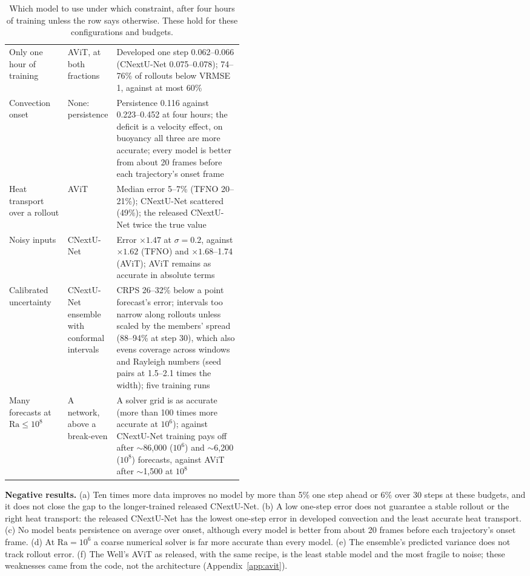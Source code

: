 \documentclass[11pt]{article}
\begin{document}
\begin{table}[tp]
\begin{tabularx}{\linewidth}{@{}>{\raggedright\arraybackslash}p{0.25\linewidth}>{\raggedright\arraybackslash}p{0.2\linewidth}>{\raggedright\arraybackslash}X@{}}
Only one hour of training & AViT, at both fractions & Developed one step 0.062--0.066 (CNextU-Net 0.075--0.078);
74--76\% of rollouts below VRMSE 1, against at most 60\% \\ \addlinespace[3pt]
Convection onset & None: persistence & Persistence 0.116 against 0.223--0.452 at four hours; the deficit is a velocity
effect, on buoyancy all three are more accurate; every model is better from about 20 frames before each
trajectory's onset frame \\ \addlinespace[3pt]
Heat transport over a rollout & AViT & Median error 5--7\% (TFNO 20--21\%); CNextU-Net scattered (49\%); the released
CNextU-Net twice the true value \\ \addlinespace[3pt]
Noisy inputs & CNextU-Net & Error $\times1.47$ at $\sigma=0.2$, against $\times1.62$ (TFNO) and $\times1.68$--1.74
(AViT); AViT remains as accurate in absolute terms \\ \addlinespace[3pt]
Calibrated uncertainty & CNextU-Net ensemble with conformal intervals & CRPS 26--32\% below a point forecast's error;
intervals too narrow along rollouts unless scaled by the members' spread (88--94\% at step 30), which also evens
coverage across windows and Rayleigh numbers (seed pairs at 1.5--2.1 times the width); five training runs \\
\addlinespace[3pt]
Many forecasts at $\mathrm{Ra}\le10^8$ & A network, above a break-even & A solver grid is as accurate (more than 100
times more accurate at $10^6$); against CNextU-Net training pays off after $\sim$86,000 ($10^6$) and $\sim$6,200
($10^8$) forecasts, against AViT after $\sim$1,500 at $10^8$ \\
\bottomrule
\end{tabularx}
\caption{Which model to use under which constraint, after four hours of training unless the row says otherwise. These
hold for these configurations and budgets.}
\label{tab:choice}
\end{table}

\textbf{Negative results.} (a) Ten times more data improves no model by more than 5\% one step ahead or 6\% over 30
steps at these budgets, and it does not close the gap to the longer-trained released CNextU-Net. (b) A low one-step
error does not guarantee
a stable rollout or the right heat transport: the released CNextU-Net has the lowest one-step error in developed
convection and the least accurate heat transport. (c) No model beats persistence on average over onset, although every model is better from about 20
frames before each trajectory's onset frame. (d) At
$\mathrm{Ra}=10^6$ a coarse numerical solver is far more accurate than every model. (e) The ensemble's predicted
variance does not track rollout error. (f) The Well's AViT as released, with the same recipe, is the least stable
model and the most fragile to noise; these weaknesses came from the code, not the architecture
(Appendix~\ref{app:avit}).
\end{document}
